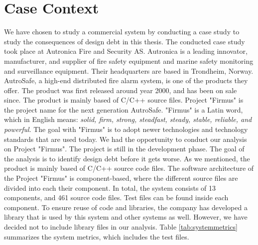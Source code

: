 \section{Case Context}
\label{sec:casecontext}
We have chosen to study a commercial system by conducting a case study to study the consequences of design debt in this thesis. The conducted case study took place at Autronica Fire and Security AS. Autronica is a leading innovator, manufacturer, and supplier of fire safety equipment and marine safety monitoring and surveillance equipment. Their headquarters are based in Trondheim, Norway. AutroSafe, a high-end distributed fire alarm system, is one of the products they offer. The product was first released around year 2000, and has been on sale since. The product is mainly based of C/C++ source files. Project "Firmus" is the project name for the next generation AutroSafe. "Firmus" is a Latin word, which in English means: \textit{solid, firm, strong, steadfast, steady, stable, reliable, and powerful}. The goal with "Firmus" is to adopt newer technologies and technology standards that are used today. We had the opportunity to conduct our analysis on Project "Firmus". The project is still in the development phase. The goal of the analysis is to identify design debt before it gets worse. As we mentioned, the product is mainly based of C/C++ source code files. The software architecture of the Project "Firmus" is component-based, where the different source files are divided into each their component. In total, the system consists of 13 components, and 461 source code files. Test files can be found inside each component. To ensure reuse of code and libraries, the company has developed a library that is used by this system and other systems as well. However, we have decided not to include library files in our analysis. Table \ref{tab:systemmetrics} summarizes the system metrics, which includes the test files.


